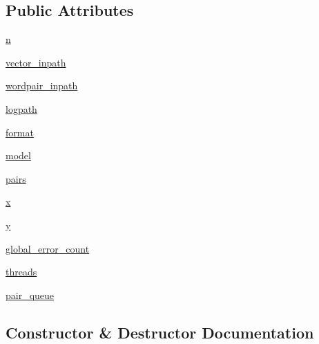 \subsection*{Public Attributes}
\begin{DoxyCompactItemize}
\item 
\hyperlink{classsrc_1_1eval_1_1word__similarity_1_1_word_sim_master_thread_a2a61f1955df699b96e3d81dd5359d6f9}{n}
\item 
\hyperlink{classsrc_1_1eval_1_1word__similarity_1_1_word_sim_master_thread_ab8cddb103eb1085ebe7905ea6f1ef850}{vector\+\_\+inpath}
\item 
\hyperlink{classsrc_1_1eval_1_1word__similarity_1_1_word_sim_master_thread_a1322d5a0ef82c1b69d2cbf4b2f2bb9b0}{wordpair\+\_\+inpath}
\item 
\hyperlink{classsrc_1_1eval_1_1word__similarity_1_1_word_sim_master_thread_a3ea3cf72df7f131c3fdd3f55255a97ea}{logpath}
\item 
\hyperlink{classsrc_1_1eval_1_1word__similarity_1_1_word_sim_master_thread_a7b9dd6657a3b02d0b2e4e81491179721}{format}
\item 
\hyperlink{classsrc_1_1eval_1_1word__similarity_1_1_word_sim_master_thread_a59eac2f3cbe15c361e88cb64c6ee3296}{model}
\item 
\hyperlink{classsrc_1_1eval_1_1word__similarity_1_1_word_sim_master_thread_afbf0a3906f1ba3ffe6f545c968d3ae1b}{pairs}
\item 
\hyperlink{classsrc_1_1eval_1_1word__similarity_1_1_word_sim_master_thread_abfec0653260234f16e22e15c689a168f}{x}
\item 
\hyperlink{classsrc_1_1eval_1_1word__similarity_1_1_word_sim_master_thread_ae1722e9d60c02419eb0c493592761d10}{y}
\item 
\hyperlink{classsrc_1_1eval_1_1word__similarity_1_1_word_sim_master_thread_a3f91e4211ec9b99e2cbaa67389e9c098}{global\+\_\+error\+\_\+count}
\item 
\hyperlink{classsrc_1_1eval_1_1word__similarity_1_1_word_sim_master_thread_ad5e91c785be6ca4909c7a154afc1a031}{threads}
\item 
\hyperlink{classsrc_1_1eval_1_1word__similarity_1_1_word_sim_master_thread_a8539ca8727131e7d9b2707e8ed4bd03b}{pair\+\_\+queue}
\end{DoxyCompactItemize}


\subsection{Constructor \& Destructor Documentation}
